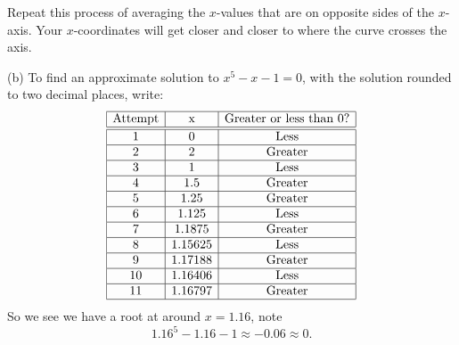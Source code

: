 \documentclass{ximera}
\begin{document}
\begin{question}
\begin{freeResponse}
    Repeat this process of averaging the $x$-values that are on
    opposite sides of the $x$-axis. Your $x$-coordinates will get closer
    and closer to where the curve crosses the axis.



    (b) To find an approximate  solution to $x^5-x-1=0$, with the solution rounded to
    two decimal places, write:
    \[
    \begin{array}{|c|c|c|c|}\hline
      \text{Attempt} & \text{x} & \text{Greater or less than $0$?} \\ \hline\hline
      1 & 0 & \text{Less} \\ \hline
      2 & 2 & \text{Greater}  \\ \hline
      3 & 1 & \text{Less}  \\ \hline
      4 & 1.5 & \text{Greater}  \\ \hline
      5 & 1.25 & \text{Greater}  \\ \hline
      6 & 1.125 & \text{Less}  \\ \hline
      7 & 1.1875 & \text{Greater}  \\ \hline
      8 & 1.15625 & \text{Less}  \\ \hline
      9 & 1.17188 & \text{Greater} \\ \hline
      10 & 1.16406 & \text{Less} \\ \hline
      11 & 1.16797 & \text{Greater} \\ \hline
  \end{array}
  \]
  So we see we have a root at around $x=1.16$, note
  \[
  1.16^5 - 1.16 -1 \approx  -0.06 \approx 0.
  \]
  \end{freeResponse}
\end{question}
\mynewpage
\end{document}

